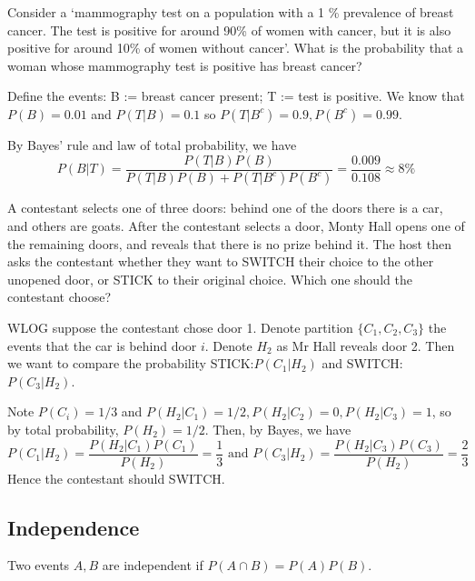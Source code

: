 \documentclass[11pt]{article}
\begin{document}
\begin{exercise}
  Consider a ‘mammography test on a population with a 1 \% prevalence of breast cancer. The test is positive for around 90\% of women with cancer, but it is also positive for around 10\% of women without cancer’.  
  What is the probability that a woman whose mammography test is positive has breast cancer?
\end{exercise}
\begin{solution}
  Define the events: B := breast cancer present; T := test is positive. We know that \(P(B)=0.01\) and \(P(T|B)=0.1\) so \(P(T|B^c)=0.9, P(B^c)=0.99\). 

  By Bayes' rule and law of total probability, we have 
  \[P(B|T)=\frac{P(T|B)P(B)}{P(T|B)P(B)+P(T|B^c)P(B^c)}=\frac{0.009}{0.108}\approx 8\%\]
\end{solution}

\begin{exercise}
  A contestant selects one of three doors: behind one of the doors there is a car, and others are goats. After the contestant selects a door, Monty Hall opens one of the remaining doors, and reveals that there is no prize behind it. The host then asks the contestant whether they want to SWITCH their choice to the other unopened door, or STICK to their original choice. Which one should the contestant choose?
\end{exercise}
\begin{solution}
  WLOG suppose the contestant chose door 1. Denote partition \(\{C_1,C_2,C_3\}\) the events that the car is behind door \(i\). Denote \(H_2\) as Mr Hall reveals door 2. Then we want to compare the probability STICK:\(P(C_1|H_2)\) and SWITCH:\(P(C_3|H_2)\).

  Note \(P(C_i)=1/3\) and \(P(H_2|C_1)=1/2, P(H_2|C_2)=0, P(H_2|C_3)=1\), so by total probability, \(P(H_2)=1/2\). Then, by Bayes, we have \[P(C_1|H_2)=\frac{P(H_2|C_1)P(C_1)}{P(H_2)}=\frac{1}{3} \text{ and } P(C_3|H_2)=\frac{P(H_2|C_3)P(C_3)}{P(H_2)}=\frac{2}{3}\] Hence the contestant should SWITCH.
\end{solution}
\subsection{Independence}
\begin{definition}
  Two events \(A,B\) are independent if \(P(A\cap B)=P(A)P(B)\).
\end{definition}
\end{document}
